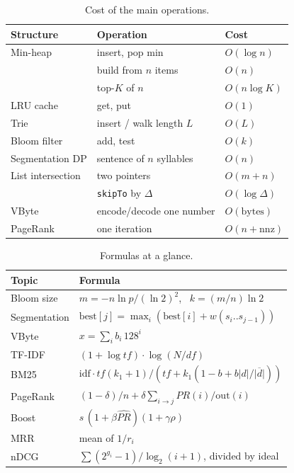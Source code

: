 \documentclass[9pt,twocolumn,a4paper]{extarticle}
\newcommand{\code}[1]{\texttt{#1}}
\begin{document}
\begin{table}[H]
\centering
\caption{Cost of the main operations.}
\label{tab:complexity}
\footnotesize
\begin{tabular}{@{}p{2.6cm}p{2.9cm}l@{}}
\toprule
Structure & Operation & Cost \\
\midrule
Min-heap & insert, pop min & $O(\log n)$ \\
 & build from $n$ items & $O(n)$ \\
 & top-$K$ of $n$ & $O(n\log K)$ \\
LRU cache & get, put & $O(1)$ \\
Trie & insert / walk length $L$ & $O(L)$ \\
Bloom filter & add, test & $O(k)$ \\
Segmentation DP & sentence of $n$ syllables & $O(n)$ \\
List intersection & two pointers & $O(m+n)$ \\
 & \code{skipTo} by $\Delta$ & $O(\log\Delta)$ \\
VByte & encode/decode one number & $O(\text{bytes})$ \\
PageRank & one iteration & $O(n+\text{nnz})$ \\
\bottomrule
\end{tabular}
\end{table}

\begin{table}[H]
\centering
\caption{Formulas at a glance.}
\label{tab:formulas}
\footnotesize
\begin{tabular}{@{}p{2.0cm}p{5.6cm}@{}}
\toprule
Topic & Formula \\
\midrule
Bloom size & $m=-n\ln p/(\ln2)^2$, \ $k=(m/n)\ln2$ \\
Segmentation & $\text{best}[j]=\max_i(\text{best}[i]+w(s_i..s_{j-1}))$ \\
VByte & $x=\sum_i b_i\,128^i$ \\
TF-IDF & $(1+\log tf)\cdot\log(N/df)$ \\
BM25 & $\text{idf}\cdot tf(k_1{+}1)/(tf+k_1(1-b+b|d|/\overline{|d|}))$ \\
PageRank & $(1-\delta)/n+\delta\sum_{i\to j}PR(i)/\text{out}(i)$ \\
Boost & $s\,(1+\beta\widehat{PR})(1+\gamma\rho)$ \\
MRR & mean of $1/r_i$ \\
nDCG & $\sum(2^{g_i}-1)/\log_2(i+1)$, divided by ideal \\
\bottomrule
\end{tabular}
\end{table}
\end{document}
